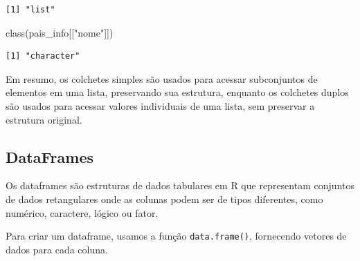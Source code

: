 \documentclass[
  portuguese,
  letterpaper,
  DIV=11,
  numbers=noendperiod]{scrreprt}
\newenvironment{Shaded}{\begin{snugshade}}{\end{snugshade}}
\newcommand{\FunctionTok}[1]{\textcolor[rgb]{0.28,0.35,0.67}{#1}}
\newcommand{\NormalTok}[1]{\textcolor[rgb]{0.00,0.23,0.31}{#1}}
\newcommand{\StringTok}[1]{\textcolor[rgb]{0.13,0.47,0.30}{#1}}
\theoremstyle{definition}
\theoremstyle{remark}
\begin{document}
\begin{verbatim}
[1] "list"
\end{verbatim}

\begin{Shaded}
\begin{Highlighting}[]
\FunctionTok{class}\NormalTok{(pais\_info[[}\StringTok{"nome"}\NormalTok{]])}
\end{Highlighting}
\end{Shaded}

\begin{verbatim}
[1] "character"
\end{verbatim}

\begin{tcolorbox}[enhanced jigsaw, leftrule=.75mm, opacitybacktitle=0.6, colback=white, coltitle=black, colframe=quarto-callout-note-color-frame, titlerule=0mm, left=2mm, opacityback=0, breakable, bottomtitle=1mm, toprule=.15mm, title=\textcolor{quarto-callout-note-color}{\faInfo}\hspace{0.5em}{Resumindo}, colbacktitle=quarto-callout-note-color!10!white, arc=.35mm, rightrule=.15mm, bottomrule=.15mm, toptitle=1mm]

Em resumo, os colchetes simples são usados para acessar subconjuntos de
elementos em uma lista, preservando sua estrutura, enquanto os colchetes
duplos são usados para acessar valores individuais de uma lista, sem
preservar a estrutura original.

\end{tcolorbox}

\subsection{DataFrames}\label{dataframes}

Os dataframes são estruturas de dados tabulares em R que representam
conjuntos de dados retangulares onde as colunas podem ser de tipos
diferentes, como numérico, caractere, lógico ou fator.

Para criar um dataframe, usamos a função \texttt{data.frame()},
fornecendo vetores de dados para cada coluna.
\end{document}
